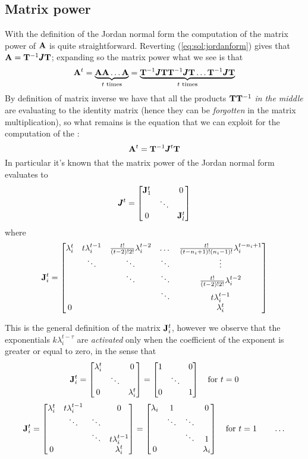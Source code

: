 \subsection{Matrix power} \label{sec:sol:matrixpower}
	
	With the definition of the Jordan normal form the computation of the matrix power of $\mathbf{A}$ is quite straightforward. Reverting (\ref{eq:sol:jordanform}) gives that $\mathbf{A} = \mathbf{T}^{-1} \pmb{J} \mathbf{T}$; expanding so the matrix power what we see is that
	\[ \mathbf{A}^t = \underbrace{\mathbf{A} \mathbf{A} \dots \mathbf{A}}_\textrm{$t$ times} = \underbrace{ \mathbf{T}^{-1} \pmb{J} \mathbf{T} \mathbf{T}^{-1} \pmb{J} \mathbf{T} \dots \mathbf{T}^{-1} \pmb{J} \mathbf{T} }_\textrm{$t$ times} \]
	By definition of matrix inverse we have that all the products $\mathbf{T} \mathbf{T}^{-1}$ \textit{in the middle} are evaluating to the identity matrix (hence they can be \textit{forgotten} in the matrix multiplication), so what remains is the equation that we can exploit for the computation of the :
	\begin{equation} \label{eq:sol:matrixpower}
		\mathbf{A}^t = \mathbf{T}^{-1} \pmb{J}^t \mathbf{T}
	\end{equation}
	In particular it's known that the matrix power of the Jordan normal form evaluates to
	\begin{equation} 
		\pmb{J} ^t = \begin{bmatrix} \mathbf{J}_1^t & & 0 \\ & \ddots \\ 0 & & \mathbf{J}_l^t \end{bmatrix} 
	\end{equation}
	where
	\begin{equation} \label{eq:sol:temp4} \mathbf{J}_i^t = \begin{bmatrix}  
		\lambda_i^t & t\lambda_i^{t-1} & \frac{t!}{(t-2)!2!} \lambda_i^{t-2} & \dots & \frac{t!}{(t-n_i+1)!(n_i-1)!} \lambda_i^{t-n_i+1}   \\
		& \ddots & \ddots & \ddots & \vdots \\
		&& \ddots & \ddots & \frac{t!}{(t-2)!2!} \lambda_i^{t-2} \\
		&&&  \ddots & t \lambda_i^{t-1} \\ 
		0  &&&& \lambda_i^t
	 \end{bmatrix} \end{equation}

	This is the general definition of the matrix $\mathbf{J}_i^t$, however we observe that the exponentials $k \lambda_i^{t-\tau}$ are \textit{activated} only when the coefficient of the exponent is greater or equal to zero, in the sense that
	\[ \mathbf{J}_i^t = \begin{bmatrix} \lambda_i^t & & 0 \\ & \ddots  \\ 0& & \lambda_i^t \end{bmatrix} = \begin{bmatrix} 1 & & 0 \\ & \ddots \\ 0 & & 1 \end{bmatrix} \quad \textrm{for } t= 0 \]
	\[ \mathbf{J}_i^t = \begin{bmatrix} \lambda_i^t & t \lambda_i^{t-1} & & 0 \\ 
	& \ddots & \ddots  \\ & & \ddots & t \lambda_i^{t-1} \\ 
	0 & & & \lambda_i^t \end{bmatrix} = \begin{bmatrix} \lambda_i & 1 & & 0 \\ 
	& \ddots & \ddots  \\ & & \ddots & 1 \\ 
	0 & & & \lambda_i \end{bmatrix} \quad \textrm{for } t=1 \qquad \dots\]
	
